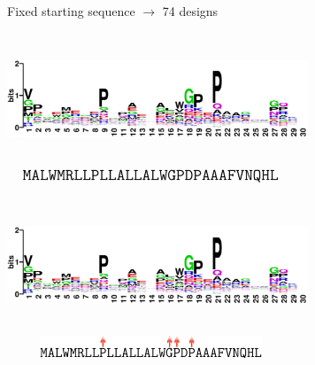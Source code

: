 \documentclass{beamer}
\begin{document}








\begin{frame}
\centering
Fixed starting sequence $\rightarrow$ 74 designs\\
\begin{adjustwidth}{-1.5em}{-2.5em}
\includegraphics[width=340px,height=150px]{../img/logo.png}\\ 
\vspace{10px}
\hspace{18px}\includegraphics[width=325px,height=15px]{../img/sequence.png}
\end{adjustwidth}
\end{frame}

\begin{frame}
\begin{adjustwidth}{-1.5em}{-2.5em}
\includegraphics[width=340px,height=150px]{../img/logo.png}\\ 
\hspace{18px}\includegraphics[width=325px,height=25px]{../img/sequence2.png}
\end{adjustwidth}
\end{frame}
\end{document}
